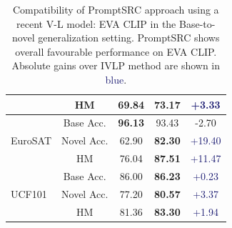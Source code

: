 \begin{table}[t!]
{\begin{tabular}{lc|c c c}
                               & HM            & 69.84 & \textbf{73.17}       & \textcolor{MidnightBlue}{{+3.33}}\\
\midrule
\multirow{3}{*}{EuroSAT}       & Base Acc.     & \textbf{96.13 } &93.43              &  \textcolor{Bittersweet}{{-2.70}}\\
                               & Novel Acc.        & 62.90& \textbf{82.30}           & \textcolor{MidnightBlue}{{+19.40}}\\
                               & HM             & 76.04& \textbf{87.51}   &  \textcolor{MidnightBlue}{{+11.47}}\\
\midrule
\multirow{3}{*}{UCF101}        & Base Acc.      & 86.00  &\textbf{86.23}           & \textcolor{MidnightBlue}{{+0.23}}\\
                               & Novel Acc.     & 77.20  &\textbf{80.57 }          &  \textcolor{MidnightBlue}{{+3.37}}\\
                               & HM           & 81.36 &\textbf{83.30}    & \textcolor{MidnightBlue}{{+1.94}}\\
\bottomrule
\end{tabular}
}\vspace{-0.5em}
    \caption{\small\textnormal{Compatibility of PromptSRC approach using a recent V-L model: EVA CLIP \cite{fang2023eva} in the Base-to-novel generalization setting}. PromptSRC shows overall favourable performance on EVA CLIP. Absolute gains over IVLP method are shown in \textcolor{MidnightBlue}{blue}.}
    \label{tab_appendix:eva_clip_comparison}
\end{table}

